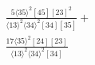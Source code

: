 \documentclass[varwidth, border=5pt]{standalone}
\begin{document}
\begin{my}
$\begin{gathered}
\scriptscriptstyle\frac{5⟨35⟩^2[45][23]^2}{⟨13⟩^2⟨34⟩^2[34][35]}+\\
\scriptscriptstyle\frac{17⟨35⟩^2[24][23]}{⟨13⟩^2⟨34⟩^2[34]}\phantom{+}
\end{gathered}$
\end{my}
\end{document}
